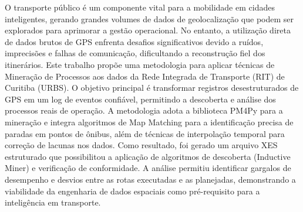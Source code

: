 
\begin{resumoutfpr}%
O transporte público é um componente vital para a mobilidade em cidades inteligentes, gerando grandes volumes de dados de geolocalização que podem ser explorados para aprimorar a gestão operacional. No entanto, a utilização direta de dados brutos de GPS enfrenta desafios significativos devido a ruídos, imprecisões e falhas de comunicação, dificultando a reconstrução fiel dos itinerários. Este trabalho propõe uma metodologia para aplicar técnicas de Mineração de Processos aos dados da Rede Integrada de Transporte (RIT) de Curitiba (URBS). O objetivo principal é transformar registros desestruturados de GPS em um log de eventos confiável, permitindo a descoberta e análise dos processos reais de operação. A metodologia adota a biblioteca PM4Py para a mineração e integra algoritmos de Map Matching para a identificação precisa de paradas em pontos de ônibus, além de técnicas de interpolação temporal para correção de lacunas nos dados. Como resultado, foi gerado um arquivo XES estruturado que possibilitou a aplicação de algoritmos de descoberta (Inductive Miner) e verificação de conformidade. A análise permitiu identificar gargalos de desempenho e desvios entre as rotas executadas e as planejadas, demonstrando a viabilidade da engenharia de dados espaciais como pré-requisito para a inteligência em transporte.
\end{resumoutfpr}
